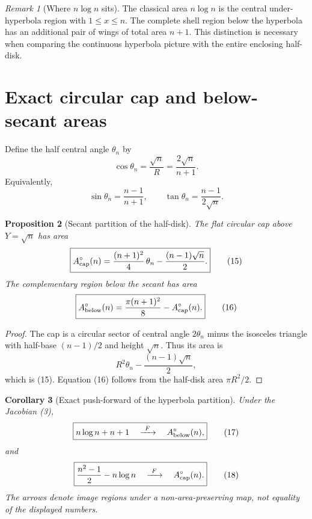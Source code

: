 \documentclass[11pt]{amsart}
\newtheorem{proposition}{Proposition}
\newtheorem{corollary}[proposition]{Corollary}
\theoremstyle{remark}
\newtheorem{remark}[proposition]{Remark}
\begin{document}
\begin{remark}[Where $n\log n$ sits]
The classical area $n\log n$ is the central under-hyperbola region with $1\le x\le n$.  The complete shell region below the hyperbola has an additional pair of wings of total area $n+1$.  This distinction is necessary when comparing the continuous hyperbola picture with the entire enclosing half-disk.
\end{remark}

\section{Exact circular cap and below-secant areas}
Define the half central angle $\theta_n$ by
\begin{equation}
\cos\theta_n=\frac{\sqrt n}{R}=\frac{2\sqrt n}{n+1}. \tag{13}
\end{equation}
Equivalently,
\begin{equation}
\sin\theta_n=\frac{n-1}{n+1},
\qquad
\tan\theta_n=\frac{n-1}{2\sqrt n}. \tag{14}
\end{equation}

\begin{proposition}[Secant partition of the half-disk]\label{prop:circlepartition}
The flat circular cap above $Y=\sqrt n$ has area
\begin{equation}
\boxed{
A_{\rm cap}^{\circ}(n)
=\frac{(n+1)^2}{4}\,\theta_n
-\frac{(n-1)\sqrt n}{2}.}
\tag{15}
\end{equation}
The complementary region below the secant has area
\begin{equation}
\boxed{
A_{\rm below}^{\circ}(n)
=\frac{\pi(n+1)^2}{8}
-A_{\rm cap}^{\circ}(n).}
\tag{16}
\end{equation}
\end{proposition}

\begin{proof}
The cap is a circular sector of central angle $2\theta_n$ minus the isosceles triangle with half-base $(n-1)/2$ and height $\sqrt n$.  Thus its area is
\[
R^2\theta_n-\frac{(n-1)\sqrt n}{2},
\]
which is (15).  Equation (16) follows from the half-disk area $\pi R^2/2$.
\end{proof}

\begin{corollary}[Exact push-forward of the hyperbola partition]\label{cor:pushpartition}
Under the Jacobian (3),
\begin{equation}
\boxed{
 n\log n+n+1
\quad\xrightarrow{\ F\ }\quad
A_{\rm below}^{\circ}(n),}
\tag{17}
\end{equation}
and
\begin{equation}
\boxed{
 \frac{n^2-1}{2}-n\log n
\quad\xrightarrow{\ F\ }\quad
A_{\rm cap}^{\circ}(n).}
\tag{18}
\end{equation}
The arrows denote image regions under a non-area-preserving map, not equality of the displayed numbers.
\end{corollary}
\end{document}
